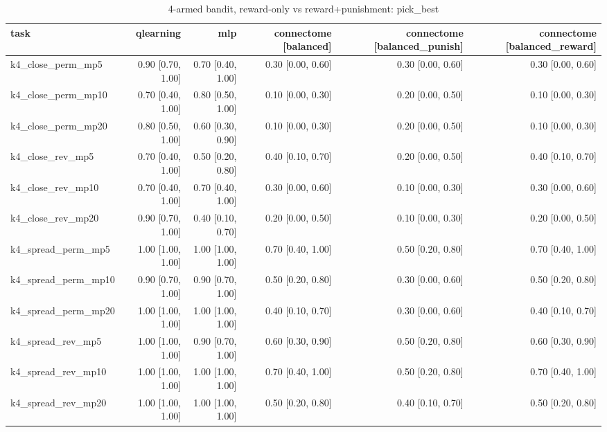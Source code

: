 \begin{table}[t]
\centering
\small
\begin{tabular}{lrrrrr}
\toprule
task & qlearning & mlp & connectome [balanced] & connectome [balanced\_punish] & connectome [balanced\_reward] \\
\midrule
k4\_close\_perm\_mp5 & 0.90 [0.70, 1.00] & 0.70 [0.40, 1.00] & 0.30 [0.00, 0.60] & 0.30 [0.00, 0.60] & 0.30 [0.00, 0.60] \\
k4\_close\_perm\_mp10 & 0.70 [0.40, 1.00] & 0.80 [0.50, 1.00] & 0.10 [0.00, 0.30] & 0.20 [0.00, 0.50] & 0.10 [0.00, 0.30] \\
k4\_close\_perm\_mp20 & 0.80 [0.50, 1.00] & 0.60 [0.30, 0.90] & 0.10 [0.00, 0.30] & 0.20 [0.00, 0.50] & 0.10 [0.00, 0.30] \\
k4\_close\_rev\_mp5 & 0.70 [0.40, 1.00] & 0.50 [0.20, 0.80] & 0.40 [0.10, 0.70] & 0.20 [0.00, 0.50] & 0.40 [0.10, 0.70] \\
k4\_close\_rev\_mp10 & 0.70 [0.40, 1.00] & 0.70 [0.40, 1.00] & 0.30 [0.00, 0.60] & 0.10 [0.00, 0.30] & 0.30 [0.00, 0.60] \\
k4\_close\_rev\_mp20 & 0.90 [0.70, 1.00] & 0.40 [0.10, 0.70] & 0.20 [0.00, 0.50] & 0.10 [0.00, 0.30] & 0.20 [0.00, 0.50] \\
k4\_spread\_perm\_mp5 & 1.00 [1.00, 1.00] & 1.00 [1.00, 1.00] & 0.70 [0.40, 1.00] & 0.50 [0.20, 0.80] & 0.70 [0.40, 1.00] \\
k4\_spread\_perm\_mp10 & 0.90 [0.70, 1.00] & 0.90 [0.70, 1.00] & 0.50 [0.20, 0.80] & 0.30 [0.00, 0.60] & 0.50 [0.20, 0.80] \\
k4\_spread\_perm\_mp20 & 1.00 [1.00, 1.00] & 1.00 [1.00, 1.00] & 0.40 [0.10, 0.70] & 0.30 [0.00, 0.60] & 0.40 [0.10, 0.70] \\
k4\_spread\_rev\_mp5 & 1.00 [1.00, 1.00] & 0.90 [0.70, 1.00] & 0.60 [0.30, 0.90] & 0.50 [0.20, 0.80] & 0.60 [0.30, 0.90] \\
k4\_spread\_rev\_mp10 & 1.00 [1.00, 1.00] & 1.00 [1.00, 1.00] & 0.70 [0.40, 1.00] & 0.50 [0.20, 0.80] & 0.70 [0.40, 1.00] \\
k4\_spread\_rev\_mp20 & 1.00 [1.00, 1.00] & 1.00 [1.00, 1.00] & 0.50 [0.20, 0.80] & 0.40 [0.10, 0.70] & 0.50 [0.20, 0.80] \\
\bottomrule
\end{tabular}
\caption{4-armed bandit, reward-only vs reward+punishment: pick\_best}
\label{tab:bandit_punish_pick_best}
\end{table}